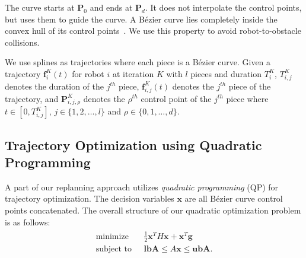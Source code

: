 \documentclass{svproc}
\newcommand{\vP}{\mathbf{P}}
\newcommand{\vg}{\mathbf{g}}
\newcommand{\vf}{\mathbf{f}}
\newcommand{\vw}{\mathbf{w}}
\newcommand{\vx}{\mathbf{x}}
\newcommand{\vlbA}{\mathbf{lbA}}
\newcommand{\vubA}{\mathbf{ubA}}
\newcommand{\vlb}{\mathbf{lb}}
\newcommand{\vub}{\mathbf{ub}}
\newcommand{\R}{\mathbb{R}} %
\begin{document}
The curve starts at $\vP_0$ and ends at $\vP_d$. It does not interpolate the control points, but uses them to guide the curve.
A B\'ezier curve lies completely inside the convex hull of its control points~\cite{Bernstein}.
We use this property to avoid robot-to-obstacle collisions.

We use splines as trajectories where each piece is a B\'ezier curve. Given a trajectory $\vf^{K}_i(t)$ for robot $i$ at iteration $K$ with $l$ pieces and duration $T^{K}_i$, $T^{K}_{i,j}$ denotes the duration of the $j^{th}$ piece, $\vf^{K}_{i,j}(t)$ denotes the $j^{th}$ piece of the trajectory, and $\vP^{K}_{i,j,\rho}$ denotes the $\rho^{th}$ control point of the $j^{th}$ piece where $t\in[0, T^{K}_{i,j}]$, $j \in \{1,2,\ldots,l\}$ and $\rho \in \{0,1,\ldots,d\}$.



\subsection{Trajectory Optimization using Quadratic Programming} \label{trajectoryOptimization}
A part of our replanning approach utilizes \emph{quadratic programming} (QP) for trajectory optimization.
The decision variables $\vx$ are all B\'ezier curve control points concatenated.
The overall structure of our quadratic optimization problem is as follows:
\begin{align}
\begin{split}
    \text{minimize}\ \ \ &\frac{1}{2}\vx^TH\vx + \vx^T\vg\\
    \text{subject to}\ \ \ & \vlbA \leq A\vx \leq \vubA.
\end{split}
\end{align}
\end{document}
